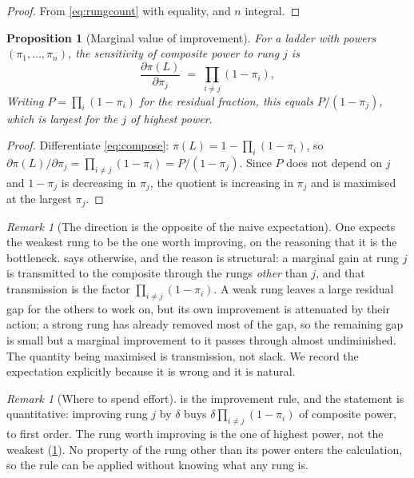 \documentclass[11pt,twocolumn,a4paper]{article}
\theoremstyle{plain}
\newtheorem{proposition}[theorem]{Proposition}
\theoremstyle{definition}
\theoremstyle{remark}
\newtheorem{remark}[theorem]{Remark}
\newcommand{\pow}{\pi}
\newcommand{\Lad}{L}
\begin{document}
\begin{proof}
From \cref{eq:rungcount} with equality, and $n$ integral.
\end{proof}

\begin{proposition}[Marginal value of improvement]
\label{prop:marginal}
For a ladder with powers $(\pow_1,\dots,\pow_n)$, the sensitivity of composite
power to rung $j$ is
\begin{equation}
\frac{\partial \pow(\Lad)}{\partial \pow_j}
\;=\; \prod_{i \neq j}(1-\pow_i),
\label{eq:marginal}
\end{equation}
Writing $P = \prod_i (1-\pow_i)$ for the residual fraction, this equals
$P/(1-\pow_j)$, which is largest for the $j$ of \emph{highest} power.
\end{proposition}

\begin{proof}
Differentiate \cref{eq:compose}: $\pow(\Lad) = 1 - \prod_i(1-\pow_i)$, so
$\partial\pow(\Lad)/\partial\pow_j = \prod_{i\neq j}(1-\pow_i) = P/(1-\pow_j)$.
Since $P$ does not depend on $j$ and $1-\pow_j$ is decreasing in $\pow_j$, the
quotient is increasing in $\pow_j$ and is maximised at the largest $\pow_j$.
\end{proof}

\begin{remark}[The direction is the opposite of the naive expectation]
\label{rem:direction}
One expects the weakest rung to be the one worth improving, on the reasoning
that it is the bottleneck.  says otherwise, and the reason
is structural: a marginal gain at rung $j$ is transmitted to the composite
through the rungs \emph{other} than $j$, and that transmission is the factor
$\prod_{i\neq j}(1-\pow_i)$. A weak rung leaves a large residual gap for the
others to work on, but its own improvement is attenuated by their action; a
strong rung has already removed most of the gap, so the remaining gap is small
but a marginal improvement to it passes through almost undiminished. The
quantity being maximised is transmission, not slack. We record the expectation
explicitly because it is wrong and it is natural.
\end{remark}

\begin{remark}[Where to spend effort]
\label{rem:whereeffort}
 is the improvement rule, and the statement is
quantitative: improving rung $j$ by $\delta$ buys
$\delta\prod_{i\neq j}(1-\pow_i)$ of composite power, to first order. The rung
worth improving is the one of highest power, not the weakest
(\cref{rem:direction}). No property of the rung other than its power enters the
calculation, so the rule can be applied without knowing what any rung is.
\end{remark}
\end{document}

